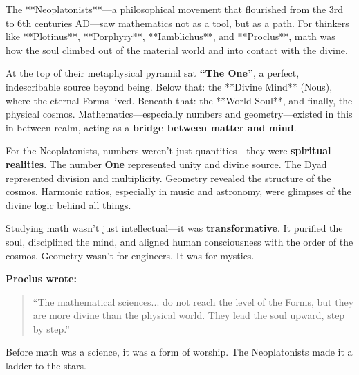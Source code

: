 \begin{tcolorbox}[colback=blue!5!white, colframe=blue!50!black, 
    title={Historical Sidebar: Neoplatonism—Mathematics as the Ascent to the Divine}]
    
        The **Neoplatonists**—a philosophical movement that flourished from the 3rd to 6th centuries AD—saw mathematics not as a tool, but as a path. For thinkers like **Plotinus**, **Porphyry**, **Iamblichus**, and **Proclus**, math was how the soul climbed out of the material world and into contact with the divine.
    
        \medskip
    
        At the top of their metaphysical pyramid sat \textbf{“The One”}, a perfect, indescribable source beyond being. Below that: the **Divine Mind** (Nous), where the eternal Forms lived. Beneath that: the **World Soul**, and finally, the physical cosmos. Mathematics—especially numbers and geometry—existed in this in-between realm, acting as a \textbf{bridge between matter and mind}.
    
        \medskip
    
        For the Neoplatonists, numbers weren’t just quantities—they were \textbf{spiritual realities}. The number \textbf{One} represented unity and divine source. The Dyad represented division and multiplicity. Geometry revealed the structure of the cosmos. Harmonic ratios, especially in music and astronomy, were glimpses of the divine logic behind all things.
    
        \medskip
    
        Studying math wasn’t just intellectual—it was \textbf{transformative}. It purified the soul, disciplined the mind, and aligned human consciousness with the order of the cosmos. Geometry wasn’t for engineers. It was for mystics.
    
        \medskip
    
        \textbf{Proclus wrote:}
        \begin{quote}
        “The mathematical sciences... do not reach the level of the Forms, but they are more divine than the physical world. They lead the soul upward, step by step.”
        \end{quote}
    
        Before math was a science, it was a form of worship. The Neoplatonists made it a ladder to the stars.
    
\end{tcolorbox}

